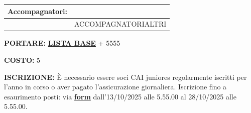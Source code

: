 \documentclass[12pt]{article}
\begin{document}
\vspace{0.3cm}

\noindent
{\small
\begin{tabular}{|p{3.5cm}|p{\dimexpr\textwidth-3.5cm-4\tabcolsep-3\arrayrulewidth\relax}|}
\hline
\rowcolor{celeste}\textbf{Accompagnatori:} & \cellcolor{arancione}{Arturo} \\ 
\hline
 & {{ACCOMPAGNATORIALTRI}} \\ 
\hline
\end{tabular}
}

\vspace{0.3cm}

\noindent
{\small
\textbf{PORTARE:} \href{https://www.cairoma.it/?page_id=22206}{\textbf{LISTA BASE}} + 5555

\vspace{0.2cm}
\noindent
\textbf{COSTO:} 5

\vspace{0.2cm}
\noindent
\textbf{ISCRIZIONE:} È necessario essere soci CAI juniores regolarmente iscritti per l'anno in corso o aver pagato l'assicurazione giornaliera.
Iscrizione fino a esaurimento posti: via \href{www.google.com}{\textbf{form}} dall'13/10/2025 alle 5.55.00 al 28/10/2025 alle 5.55.00.
}
\end{document}
